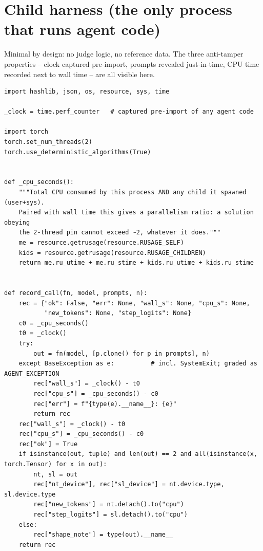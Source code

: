 \documentclass[11pt]{article}
\begin{document}
\section{Child harness (the only process that runs agent code)}
\label{app:child}

Minimal by design: no judge logic, no reference data. The three anti-tamper properties
-- clock captured pre-import, prompts revealed just-in-time, CPU time recorded next to
wall time -- are all visible here.

\begin{lstlisting}[style=py]
import hashlib, json, os, resource, sys, time

_clock = time.perf_counter   # captured pre-import of any agent code

import torch
torch.set_num_threads(2)
torch.use_deterministic_algorithms(True)


def _cpu_seconds():
    """Total CPU consumed by this process AND any child it spawned (user+sys).
    Paired with wall time this gives a parallelism ratio: a solution obeying
    the 2-thread pin cannot exceed ~2, whatever it does."""
    me = resource.getrusage(resource.RUSAGE_SELF)
    kids = resource.getrusage(resource.RUSAGE_CHILDREN)
    return me.ru_utime + me.ru_stime + kids.ru_utime + kids.ru_stime


def record_call(fn, model, prompts, n):
    rec = {"ok": False, "err": None, "wall_s": None, "cpu_s": None,
           "new_tokens": None, "step_logits": None}
    c0 = _cpu_seconds()
    t0 = _clock()
    try:
        out = fn(model, [p.clone() for p in prompts], n)
    except BaseException as e:          # incl. SystemExit; graded as AGENT_EXCEPTION
        rec["wall_s"] = _clock() - t0
        rec["cpu_s"] = _cpu_seconds() - c0
        rec["err"] = f"{type(e).__name__}: {e}"
        return rec
    rec["wall_s"] = _clock() - t0
    rec["cpu_s"] = _cpu_seconds() - c0
    rec["ok"] = True
    if isinstance(out, tuple) and len(out) == 2 and all(isinstance(x, torch.Tensor) for x in out):
        nt, sl = out
        rec["nt_device"], rec["sl_device"] = nt.device.type, sl.device.type
        rec["new_tokens"] = nt.detach().to("cpu")
        rec["step_logits"] = sl.detach().to("cpu")
    else:
        rec["shape_note"] = type(out).__name__
    return rec



\end{lstlisting}
\end{document}
